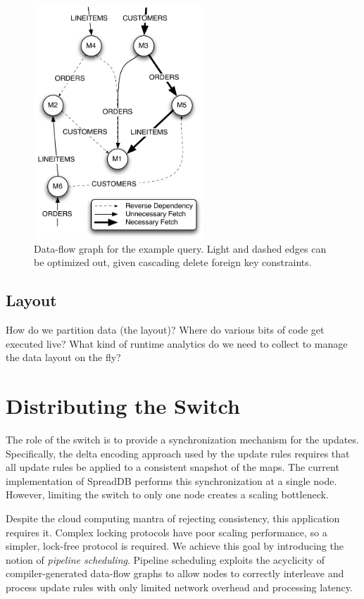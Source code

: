 \documentclass{sig-alternate}
\begin{document}
\begin{figure}
\begin{center}
\includegraphics[width=2.5in]{images/q18_graph.pdf}
\caption{Data-flow graph for the example query.  Light and dashed edges can be optimized out, given cascading delete foreign key constraints.}
\label{fig:dataflow}
\end{center}
\end{figure}

\subsection{Layout}
How do we partition data (the layout)?  Where do various bits of code get executed live?  What kind of runtime analytics do we need to collect to manage the data layout on the fly? 

\section{Distributing the Switch}
\label{sec:distswitch}
The role of the switch is to provide a synchronization mechanism for the updates.  Specifically, the delta encoding approach used by the update rules requires that all update rules be applied to a consistent snapshot of the maps.  The current implementation of SpreadDB performs this synchronization at a single node.  However, limiting the switch to only one node creates a scaling bottleneck.  

Despite the cloud computing mantra of rejecting consistency, this application requires it.  Complex locking protocols have poor scaling performance, so a simpler, lock-free protocol is required.  We achieve this goal by introducing the notion of \textit{pipeline scheduling}.  Pipeline scheduling exploits the acyclicity of compiler-generated data-flow graphs to allow nodes to correctly interleave and process update rules with only limited network overhead and processing latency.
\end{document}
